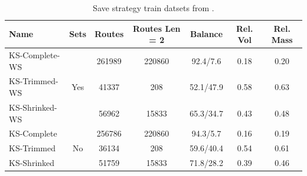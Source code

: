 \begin{table}[ht]
    \centering
    \begin{tabular}{l c c c c c c }
        \toprule
        Name           & Sets                 & Routes & Routes Len = 2 & Balance   & Rel. Vol & Rel. Mass \\
        \midrule
        KS-Complete-WS & \multirow{3}{*}{Yes} & 261989 & 220860         & 92.4/7.6  & 0.18     & 0.20      \\
        KS-Trimmed-WS  &                      & 41337  & 208            & 52.1/47.9 & 0.58     & 0.63      \\
        KS-Shrinked-WS &                      & 56962  & 15833          & 65.3/34.7 & 0.43     & 0.48      \\        \midrule
        KS-Complete    & \multirow{3}{*}{No}  & 256786 & 220860         & 94.3/5.7  & 0.16     & 0.19      \\
        KS-Trimmed     &                      & 36134  & 208            & 59.6/40.4 & 0.54     & 0.61      \\
        KS-Shrinked    &                      & 51759  & 15833          & 71.8/28.2 & 0.39     & 0.46      \\

        \bottomrule
    \end{tabular}
    \caption{Save strategy train datsets from \krebsADataSet.}
    \label{tab:saved_instances_krebs}
\end{table}